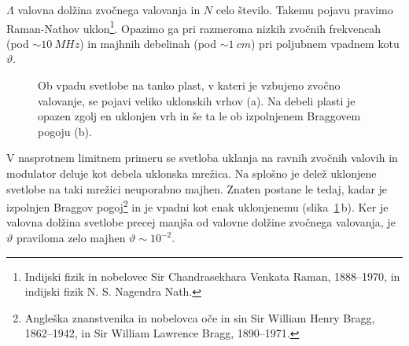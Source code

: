 $\Lambda$ valovna dolžina zvočnega valovanja in 
$N$ celo število. Takemu pojavu 
pravimo Raman-Nathov uklon\footnote{Indijski fizik in nobelovec Sir Chandrasekhara 
Venkata Raman, 1888--1970, 
in indijski fizik N. S. Nagendra Nath.}. 
Opazimo ga pri razmeroma nizkih zvočnih frekvencah 
(pod $\sim10~\si{MHz}$) in majhnih debelinah (pod $\sim 1~\si{cm}$) pri poljubnem vpadnem 
kotu $\vartheta$.
\begin{figure}[h]
\centering
\def\svgwidth{120truemm} 

\caption{Ob vpadu svetlobe na tanko plast, v kateri je vzbujeno zvočno valovanje, se 
pojavi veliko uklonskih vrhov (a). Na debeli plasti je opazen zgolj en uklonjen vrh in  
še ta le ob izpolnjenem Braggovem pogoju (b).}
\label{fig:ao_bragg}
\end{figure}

V nasprotnem limitnem primeru se svetloba uklanja na ravnih zvočnih valovih in modulator deluje 
kot debela uklonska mrežica. 
Na splošno je delež uklonjene svetlobe na taki mrežici neuporabno majhen. 
Znaten postane le tedaj, kadar je izpolnjen Braggov
pogoj\footnote{Angleška znanstvenika in nobelovca oče in sin Sir William Henry Bragg, 1862--1942,
in Sir William Lawrence Bragg, 1890--1971.}
in je vpadni kot enak uklonjenemu (slika~\ref{fig:ao_bragg}\,b).
Ker je valovna dolžina svetlobe precej manjša od valovne dolžine zvočnega valovanja, je $\vartheta$
praviloma zelo majhen $\vartheta \sim 10^{-2}$. 

